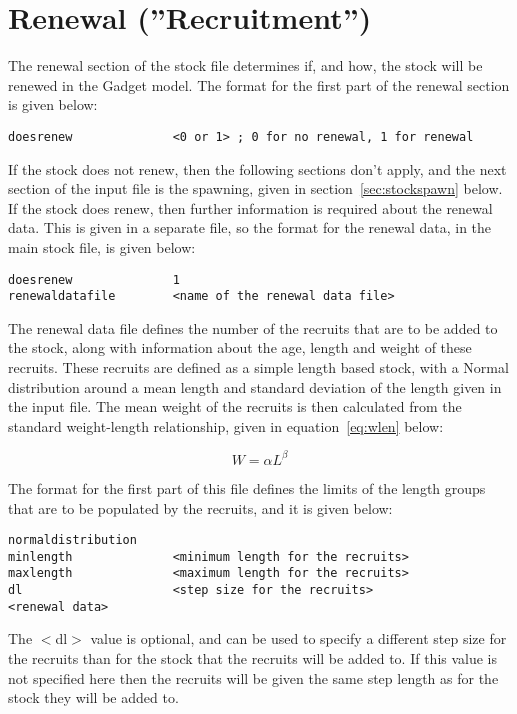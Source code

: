 \documentclass [a4paper, 10pt]{book}
\begin{document}
\section{Renewal (''Recruitment'')}\label{sec:stockrenew}
The renewal section of the stock file determines if, and how, the stock will be renewed in the Gadget model. The format for the first part of the renewal section is given below:

{\small\begin{verbatim}
doesrenew              <0 or 1> ; 0 for no renewal, 1 for renewal
\end{verbatim}}

If the stock does not renew, then the following sections don't apply, and the next section of the input file is the spawning, given in section~\ref{sec:stockspawn} below.  If the stock does renew, then further information is required about the renewal data.  This is given in a separate file, so the format for the renewal data, in the main stock file, is given below:

{\small\begin{verbatim}
doesrenew              1
renewaldatafile        <name of the renewal data file>
\end{verbatim}}

The renewal data file defines the number of the recruits that are to be added to the stock, along with information about the age, length and weight of these recruits.  These recruits are defined as a simple length based stock, with a Normal distribution around a mean length and standard deviation of the length given in the input file.  The mean weight of the recruits is then calculated from the standard weight-length relationship, given in equation~\ref{eq:wlen} below:

\begin{equation}\label{eq:wlen}
W = \alpha L ^\beta
\end{equation}

The format for the first part of this file defines the limits of the length groups that are to be populated by the recruits, and it is given below:

{\small\begin{verbatim}
normaldistribution
minlength              <minimum length for the recruits>
maxlength              <maximum length for the recruits>
dl                     <step size for the recruits>
<renewal data>
\end{verbatim}}

The $<$dl$>$ value is optional, and can be used to specify a different step size for the recruits than for the stock that the recruits will be added to.  If this value is not specified here then the recruits will be given the same step length as for the stock they will be added to.
\end{document}
